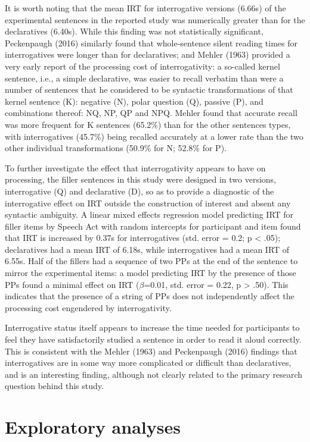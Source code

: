 \documentclass[11pt,oneside]{book}
\begin{document}
It is worth noting that the mean IRT for interrogative versions (6.66s) of the experimental sentences in the reported study was numerically greater than for the declaratives (6.40s). While this finding was not statistically significant, Peckenpaugh (2016) similarly found that whole-sentence silent reading times for interrogatives were longer than for declaratives; and Mehler (1963) provided a very early report of the processing cost of interrogativity: a so-called kernel sentence, i.e., a simple declarative, was easier to recall verbatim than were a number of sentences that he considered to be syntactic transformations of that kernel sentence (K): negative (N), polar question (Q), passive (P), and combinations thereof: NQ, NP, QP and NPQ. Mehler found that accurate recall was more frequent for K sentences (65.2\%) than for the other sentences types, with interrogatives (45.7\%) being recalled accurately at a lower rate than the two other individual transformations (50.9\% for N; 52.8\% for P).

To further investigate the effect that interrogativity appears to have on processing, the filler sentences in this study were designed in two versions, interrogative (Q) and declarative (D), so as to provide a diagnostic of the interrogative effect on IRT outside the construction of interest and absent any syntactic ambiguity. A linear mixed effects regression model predicting IRT for filler items by Speech Act with random intercepts for participant and item found that IRT is increased by 0.37s for interrogatives (std. error = 0.2; p \textless{} .05); declaratives had a mean IRT of 6.18s, while interrogatives had a mean IRT of 6.55s. Half of the fillers had a sequence of two PPs at the end of the sentence to mirror the experimental items: a model predicting IRT by the presence of those PPs found a minimal effect on IRT (\(\beta\)=0.01, std. error = 0.22, p \textgreater{} .50). This indicates that the presence of a string of PPs does not independently affect the processing cost engendered by interrogativity.

Interrogative status itself appears to increase the time needed for participants to feel they have satisfactorily studied a sentence in order to read it aloud correctly. This is consistent with the Mehler (1963) and Peckenpaugh (2016) findings that interrogatives are in some way more complicated or difficult than declaratives, and is an interesting finding, although not clearly related to the primary research question behind this study.

\hypertarget{exploratory-analyses}{%
\section{Exploratory analyses}\label{exploratory-analyses}}
\end{document}

